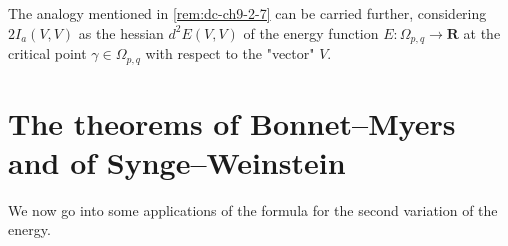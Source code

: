 \begin{remark}[Remark 2.12]
  \label{rem:dc-ch9-2-12}
  The analogy mentioned in \cref{rem:dc-ch9-2-7} can be carried further, considering
  $2I_a(V,V)$ as the hessian $d^2 E(V,V)$ of the energy function
  $E:\Omega_{p,q}\to\mathbf{R}$ at the critical point $\gamma\in\Omega_{p,q}$ with
  respect to the "vector" $V$.
\end{remark}

\section{The theorems of Bonnet–Myers and of Synge–Weinstein}

We now go into some applications of the formula for the second variation of the
energy.

